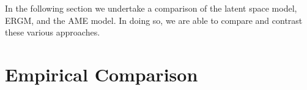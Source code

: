 \documentclass[12pt,pdflatex]{elsarticle}
\begin{document}

In the following section we undertake a comparison of the latent space model, ERGM, and the AME model. In doing so, we are able to compare and contrast these various approaches.

\section*{\textbf{Empirical Comparison}}
\end{document}
